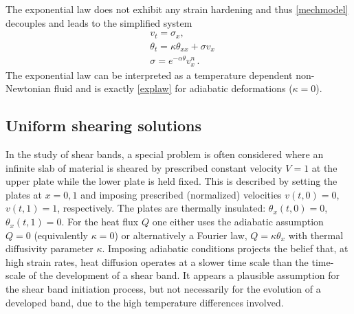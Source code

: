 \documentclass[11pt]{article}
\newcommand{\ga}{\alpha}
\theoremstyle{remark}
\begin{document}
The exponential law does not exhibit any strain hardening and thus \eqref{mechmodel} decouples and
leads to the simplified system
\begin{equation}
  \label{ARS}
  \begin{aligned}
    & v_{t} = \sigma_{x},\\
    & \theta_{t} = \kappa \theta_{ x x}  +  \sigma v_x \\
    & \sigma  = e^{-\ga\theta} v_x^n \, .
  \end{aligned}
\end{equation}
The exponential law  can be interpreted as a temperature dependent non-Newtonian fluid and {is exactly} \eqref{explaw} for adiabatic deformations ($\kappa =0$).



\subsection{Uniform shearing solutions} \label{sec:uss}

In the study of shear bands,  a special problem is often considered  where an infinite slab of material
is  sheared by prescribed constant velocity $V=1$ at the upper plate while the lower plate is held fixed.
This is described by setting the plates at $x=0, 1$ and imposing prescribed (normalized) velocities $v(t,0) = 0$,  $v(t,1) = 1$, respectively.
The plates are thermally insulated:  $ \theta_{x}(t,0) = 0$,  $\theta_{x}(t,1) = 0$.
For the heat flux $Q$ one either uses the adiabatic assumption $Q = 0$ (equivalently $\kappa = 0$)
or alternatively a Fourier  law, $Q = \kappa \theta_{x}$ with thermal diffusivity
parameter $\kappa$.
Imposing adiabatic conditions projects the belief that, at high strain rates,
heat diffusion operates at a slower time scale than the time-scale of the development
of a shear band. It appears a plausible assumption for the shear band initiation process,
but not necessarily for the evolution of a developed band,
 due to the high temperature differences involved.
\end{document}

